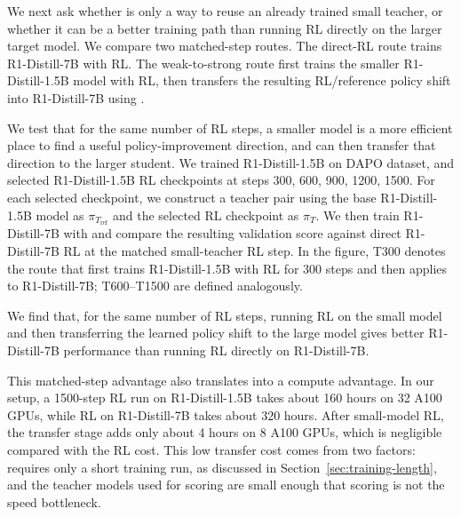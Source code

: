We next ask whether \method{} is only a way to reuse an already trained small
teacher, or whether it can be a better training path than running RL directly
on the larger target model. We compare two matched-step routes. The direct-RL
route trains R1-Distill-7B with RL. The weak-to-strong route first trains the
smaller R1-Distill-1.5B model with RL, then transfers the resulting
RL/reference policy shift into R1-Distill-7B using \method{}.

We test that for the same number of RL steps, a smaller model is a more efficient place to
find a useful policy-improvement direction, and \method{} can then transfer that
direction to the larger student. We trained R1-Distill-1.5B on DAPO dataset, and selected R1-Distill-1.5B RL checkpoints at
steps 300, 600, 900, 1200, 1500. For each selected checkpoint, we construct a
teacher pair using the base R1-Distill-1.5B model as
$\pi_{T_{\mathrm{ref}}}$ and the selected RL checkpoint as $\pi_T$. We then
train R1-Distill-7B with \method{} and compare the
resulting validation score against direct R1-Distill-7B RL at the matched
small-teacher RL step. In the figure, T300 denotes the route that first trains
R1-Distill-1.5B with RL for 300 steps and then applies \method{} to
R1-Distill-7B; T600--T1500 are defined analogously.

We find that, for the same number of RL steps, running RL on the small model and
then transferring the learned policy shift to the large model gives better
R1-Distill-7B performance than running RL directly on R1-Distill-7B.

This matched-step advantage also translates into a compute advantage. In our
setup, a 1500-step RL run on R1-Distill-1.5B takes about 160 hours on
32 A100 GPUs, while RL on R1-Distill-7B takes
about 320 hours. After small-model RL, the \method{} transfer stage adds only about 4
hours on 8 A100 GPUs, which is negligible compared with the RL cost.
This low transfer cost comes from two factors: \method{} requires only a short
training run, as discussed in Section~\ref{sec:training-length}, and the teacher models used for
scoring are small enough that scoring is not the speed bottleneck.


